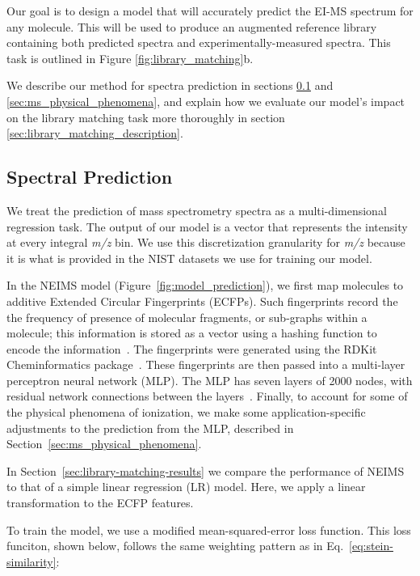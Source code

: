 \documentclass{article}
\begin{document}
Our goal is to design a model that will accurately predict the EI-MS spectrum for any molecule. This will be used to produce an augmented reference library containing both predicted spectra and experimentally-measured spectra.  This task is outlined in Figure \ref{fig:library_matching}b. 

We describe our method for spectra prediction in sections \ref{sec:ms_spectral_prediction} and \ref{sec:ms_physical_phenomena}, and explain how we evaluate our model's impact on the library matching task more thoroughly in section \ref{sec:library_matching_description}.

\subsection{Spectral Prediction}\label{sec:ms_spectral_prediction}

We treat the prediction of mass spectrometry spectra as a multi-dimensional regression task. The output of our model is a vector that represents the intensity at every integral \textit{m/z} bin. We use this discretization granularity for \textit{m/z} because it is what is provided in the NIST datasets we use for training our model.

In the NEIMS model (Figure~\ref{fig:model_prediction}), we first map molecules to additive Extended Circular Fingerprints (ECFPs).  Such fingerprints record the the frequency of presence of molecular fragments, or sub-graphs within a molecule; this information is stored as a vector using a hashing function to encode the information~\cite{Rogers_2010_ECFP}. The fingerprints were generated using the RDKit Cheminformatics package~\cite{rdkit}.
These fingerprints are then passed into a multi-layer perceptron neural network (MLP). The MLP has seven layers of 2000 nodes, with residual network connections between the layers~\cite{he_resnet}. Finally, to account for some of the physical phenomena of ionization, we make some application-specific adjustments to the prediction from the MLP, described in Section~\ref{sec:ms_physical_phenomena}.

In Section~\ref{sec:library-matching-results} we compare the performance of NEIMS to that of a simple linear regression (LR) model. Here, we apply a linear transformation to the ECFP features.

To train the model, we use a modified mean-squared-error loss function. This loss funciton, shown below, follows the same weighting pattern as in Eq.~\ref{eq:stein-similarity}:
\end{document}
